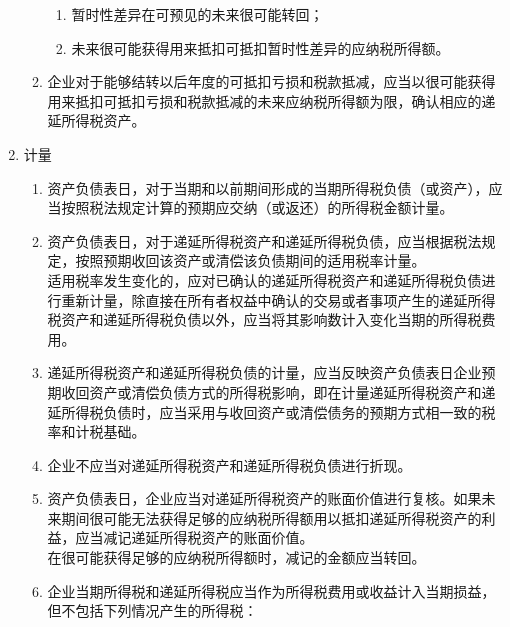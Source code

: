 \begin{appendices}
\begin{enumerate}[itemsep=0pt, leftmargin=1cm, before=\normalfont\small]
\begin{enumerate}[itemsep=0pt, leftmargin=1cm, before=\normalfont\small, start=10]
                        \begin{enumerate}[itemsep=0pt, leftmargin=1cm, before=\normalfont\small, start=1] %
                            \item 暂时性差异在可预见的未来很可能转回；
                            \item 未来很可能获得用来抵扣可抵扣暂时性差异的应纳税所得额。
                        \end{enumerate}
                  \item 企业对于能够结转以后年度的可抵扣亏损和税款抵减，应当以很可能获得用来抵扣可抵扣亏损和税款抵减的未来应纳税所得额为限，确认相应的递延所得税资产。
              \end{enumerate}
        \item 计量
              \begin{enumerate}[itemsep=0pt, leftmargin=1cm, before=\normalfont\small, start=16] %
                  \item 资产负债表日，对于当期和以前期间形成的当期所得税负债（或资产），应当按照税法规定计算的预期应交纳（或返还）的所得税金额计量。
                  \item 资产负债表日，对于递延所得税资产和递延所得税负债，应当根据税法规定，按照预期收回该资产或清偿该负债期间的适用税率计量。\\适用税率发生变化的，应对已确认的递延所得税资产和递延所得税负债进行重新计量，除直接在所有者权益中确认的交易或者事项产生的递延所得税资产和递延所得税负债以外，应当将其影响数计入变化当期的所得税费用。
                  \item 递延所得税资产和递延所得税负债的计量，应当反映资产负债表日企业预期收回资产或清偿负债方式的所得税影响，即在计量递延所得税资产和递延所得税负债时，应当采用与收回资产或清偿债务的预期方式相一致的税率和计税基础。
                  \item 企业不应当对递延所得税资产和递延所得税负债进行折现。
                  \item 资产负债表日，企业应当对递延所得税资产的账面价值进行复核。如果未来期间很可能无法获得足够的应纳税所得额用以抵扣递延所得税资产的利益，应当减记递延所得税资产的账面价值。\\在很可能获得足够的应纳税所得额时，减记的金额应当转回。
                  \item 企业当期所得税和递延所得税应当作为所得税费用或收益计入当期损益，但不包括下列情况产生的所得税：
                        \begin{enumerate}[itemsep=0pt, leftmargin=1cm, before=\normalfont\small, start=1] %

\end{enumerate}
\end{enumerate}
\end{enumerate}
\end{appendices}
